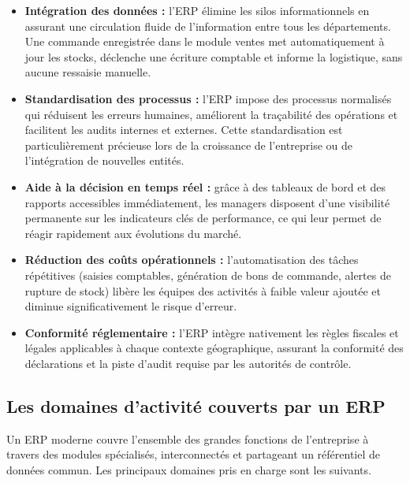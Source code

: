 \documentclass[a4paper,12pt]{report}
\begin{document}
\begin{itemize}
    \item \textbf{Intégration des données :} l'ERP élimine les silos
    informationnels en assurant une circulation fluide de l'information entre
    tous les départements. Une commande enregistrée dans le module ventes met
    automatiquement à jour les stocks, déclenche une écriture comptable et
    informe la logistique, sans aucune ressaisie manuelle.

    \item \textbf{Standardisation des processus :} l'ERP impose des processus
    normalisés qui réduisent les erreurs humaines, améliorent la traçabilité des
    opérations et facilitent les audits internes et externes. Cette
    standardisation est particulièrement précieuse lors de la croissance de
    l'entreprise ou de l'intégration de nouvelles entités.

    \item \textbf{Aide à la décision en temps réel :} grâce à des tableaux de
    bord et des rapports accessibles immédiatement, les managers disposent d'une
    visibilité permanente sur les indicateurs clés de performance, ce qui leur
    permet de réagir rapidement aux évolutions du marché.

    \item \textbf{Réduction des coûts opérationnels :} l'automatisation des
    tâches répétitives (saisies comptables, génération de bons de commande,
    alertes de rupture de stock) libère les équipes des activités à faible
    valeur ajoutée et diminue significativement le risque d'erreur.

    \item \textbf{Conformité réglementaire :} l'ERP intègre nativement les
    règles fiscales et légales applicables à chaque contexte géographique,
    assurant la conformité des déclarations et la piste d'audit requise par les
    autorités de contrôle.
\end{itemize}

\subsection{Les domaines d'activité couverts par un ERP}

Un ERP moderne couvre l'ensemble des grandes fonctions de l'entreprise à travers
des modules spécialisés, interconnectés et partageant un référentiel de données
commun. Les principaux domaines pris en charge sont les suivants.
\end{document}

